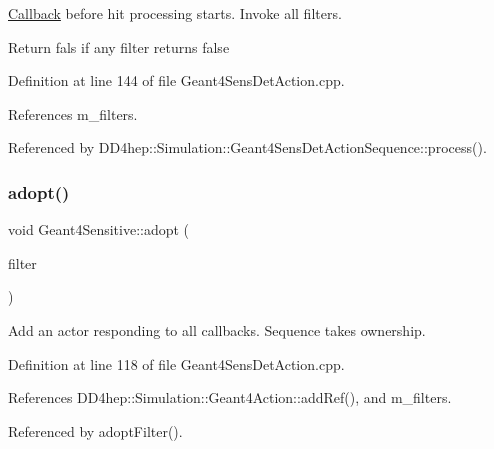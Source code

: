 \hyperlink{class_d_d4hep_1_1_callback}{Callback} before hit processing starts. Invoke all filters. 

Return fals if any filter returns false 

Definition at line 144 of file Geant4\+Sens\+Det\+Action.\+cpp.



References m\+\_\+filters.



Referenced by D\+D4hep\+::\+Simulation\+::\+Geant4\+Sens\+Det\+Action\+Sequence\+::process().

\hypertarget{class_d_d4hep_1_1_simulation_1_1_geant4_sensitive_ac1a68f5a62579041a301c8f3b3389175}{}\label{class_d_d4hep_1_1_simulation_1_1_geant4_sensitive_ac1a68f5a62579041a301c8f3b3389175} 
\subsubsection{\texorpdfstring{adopt()}{adopt()}}
{\footnotesize\ttfamily void Geant4\+Sensitive\+::adopt (\begin{DoxyParamCaption}\item[{\hyperlink{class_d_d4hep_1_1_simulation_1_1_geant4_filter}{Geant4\+Filter} $\ast$}]{filter }\end{DoxyParamCaption})}



Add an actor responding to all callbacks. Sequence takes ownership. 



Definition at line 118 of file Geant4\+Sens\+Det\+Action.\+cpp.



References D\+D4hep\+::\+Simulation\+::\+Geant4\+Action\+::add\+Ref(), and m\+\_\+filters.



Referenced by adopt\+Filter().

\hypertarget{class_d_d4hep_1_1_simulation_1_1_geant4_sensitive_a38dc5d69581c1acf08eb7aed152cf3f6}{}\label{class_d_d4hep_1_1_simulation_1_1_geant4_sensitive_a38dc5d69581c1acf08eb7aed152cf3f6} 
